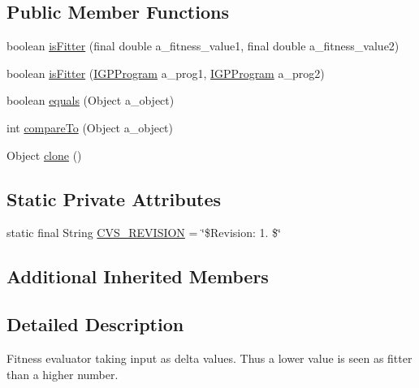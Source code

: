 \subsection*{Public Member Functions}
\begin{DoxyCompactItemize}
\item 
boolean \hyperlink{classorg_1_1jgap_1_1gp_1_1impl_1_1_delta_g_p_fitness_evaluator_ace3531032417736fdea18822e6ab4c18}{is\-Fitter} (final double a\-\_\-fitness\-\_\-value1, final double a\-\_\-fitness\-\_\-value2)
\item 
boolean \hyperlink{classorg_1_1jgap_1_1gp_1_1impl_1_1_delta_g_p_fitness_evaluator_a20f05611ae245947af88da5b3eec176c}{is\-Fitter} (\hyperlink{interfaceorg_1_1jgap_1_1gp_1_1_i_g_p_program}{I\-G\-P\-Program} a\-\_\-prog1, \hyperlink{interfaceorg_1_1jgap_1_1gp_1_1_i_g_p_program}{I\-G\-P\-Program} a\-\_\-prog2)
\item 
boolean \hyperlink{classorg_1_1jgap_1_1gp_1_1impl_1_1_delta_g_p_fitness_evaluator_a89f660b1b777421ba1b7ff5e06092d85}{equals} (Object a\-\_\-object)
\item 
int \hyperlink{classorg_1_1jgap_1_1gp_1_1impl_1_1_delta_g_p_fitness_evaluator_aa52ed31316f00ec8afa400ffed2db09a}{compare\-To} (Object a\-\_\-object)
\item 
Object \hyperlink{classorg_1_1jgap_1_1gp_1_1impl_1_1_delta_g_p_fitness_evaluator_a3275d42d5c07584f3e1a853dea5c4eae}{clone} ()
\end{DoxyCompactItemize}
\subsection*{Static Private Attributes}
\begin{DoxyCompactItemize}
\item 
static final String \hyperlink{classorg_1_1jgap_1_1gp_1_1impl_1_1_delta_g_p_fitness_evaluator_aecec97932a1625ea23af506c7b683eca}{C\-V\-S\-\_\-\-R\-E\-V\-I\-S\-I\-O\-N} = \char`\"{}\$Revision\-: 1. \$\char`\"{}
\end{DoxyCompactItemize}
\subsection*{Additional Inherited Members}


\subsection{Detailed Description}
Fitness evaluator taking input as delta values. Thus a lower value is seen as fitter than a higher number.

